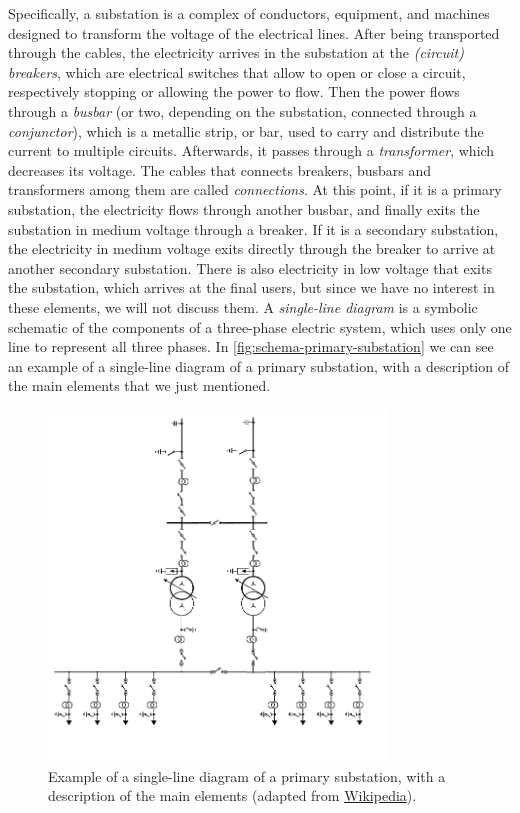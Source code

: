 Specifically, a substation is a complex of conductors, equipment, and machines designed to transform the voltage of the electrical lines. After being transported through the cables, the electricity arrives in the substation at the \emph{(circuit) breakers}, which are electrical switches that allow to open or close a circuit, respectively stopping or allowing the power to flow. Then the power flows through a \emph{busbar} (or two, depending on the substation, connected through a \emph{conjunctor}), which is a metallic strip, or bar, used to carry and distribute the current to multiple circuits. Afterwards, it passes through a \emph{transformer}, which decreases its voltage. The cables that connects breakers, busbars and transformers among them are called \emph{connections}. At this point, if it is a primary substation, the electricity flows through another busbar, and finally exits the substation in medium voltage through a breaker. If it is a secondary substation, the electricity in medium voltage exits directly through the breaker to arrive at another secondary substation. There is also electricity in low voltage that exits the substation, which arrives at the final users, but since we have no interest in these elements, we will not discuss them. A \emph{single-line diagram} is a symbolic schematic of the components of a three-phase electric system, which uses only one line to represent all three phases. In \autoref{fig:schema-primary-substation} we can see an example of a single-line diagram of a primary substation, with a description of the main elements that we just mentioned.

\begin{figure}[t]
    \centering
    \includegraphics[width=0.8\textwidth]{chapters/figures/Schema_Unifilare_Cabina_Primaria.png}
    \caption{Example of a single-line diagram of a primary substation, with a description of the main elements (adapted from \href{https://it.wikipedia.org/wiki/Cabina_primaria}{Wikipedia}).}
    \label{fig:schema-primary-substation}
\end{figure}

